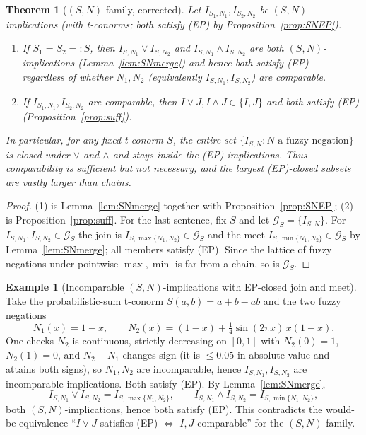 \documentclass{amsart}
\theoremstyle{plain}
\newtheorem{theorem}{Theorem}
\theoremstyle{definition}
\newtheorem{example}{Example}
\begin{document}
\begin{theorem}[$(S,N)$-family, corrected]\label{thm:SN}
Let $I_{S_1,N_1},I_{S_2,N_2}$ be $(S,N)$-implications (with t-conorms; both satisfy
\textup{(EP)} by Proposition~\ref{prop:SNEP}).
\begin{enumerate}
\item If $S_1=S_2=:S$, then $I_{S,N_1}\vee I_{S,N_2}$ and $I_{S,N_1}\wedge I_{S,N_2}$ are
\emph{both} $(S,N)$-implications (Lemma~\ref{lem:SNmerge}) and hence \emph{both} satisfy
\textup{(EP)} --- regardless of whether $N_1,N_2$ (equivalently $I_{S,N_1},I_{S,N_2}$) are
comparable.
\item If $I_{S_1,N_1},I_{S_2,N_2}$ are comparable, then $I\vee J,I\wedge J\in\{I,J\}$ and
both satisfy \textup{(EP)} (Proposition~\ref{prop:suff}).
\end{enumerate}
In particular, for any fixed t-conorm $S$, the entire set
$\{I_{S,N}:N\text{ a fuzzy negation}\}$ is closed under $\vee$ and $\wedge$ and stays
inside the \textup{(EP)}-implications.  Thus comparability is \emph{sufficient but not
necessary}, and the largest \textup{(EP)}-closed subsets are vastly larger than chains.
\end{theorem}

\begin{proof}
(1) is Lemma~\ref{lem:SNmerge} together with Proposition~\ref{prop:SNEP}; (2) is
Proposition~\ref{prop:suff}.  For the last sentence, fix $S$ and let
$\mathcal G_S=\{I_{S,N}\}$.  For $I_{S,N_1},I_{S,N_2}\in\mathcal G_S$ the join is
$I_{S,\max\{N_1,N_2\}}\in\mathcal G_S$ and the meet $I_{S,\min\{N_1,N_2\}}\in\mathcal G_S$
by Lemma~\ref{lem:SNmerge}; all members satisfy (EP).  Since the lattice of fuzzy
negations under pointwise $\max,\min$ is far from a chain, so is $\mathcal G_S$.
\end{proof}

\begin{example}[Incomparable $(S,N)$-implications with EP-closed join and meet]\label{ex:SN}
Take the probabilistic-sum t-conorm $S(a,b)=a+b-ab$ and the two fuzzy negations
\[
N_1(x)=1-x,\qquad N_2(x)=(1-x)+\tfrac14\sin(2\pi x)\,x(1-x).
\]
One checks $N_2$ is continuous, strictly decreasing on $[0,1]$ with $N_2(0)=1$,
$N_2(1)=0$, and $N_2-N_1$ changes sign (it is $\le 0.05$ in absolute value and attains both
signs), so $N_1,N_2$ are incomparable, hence $I_{S,N_1},I_{S,N_2}$ are incomparable
implications.  Both satisfy (EP).  By Lemma~\ref{lem:SNmerge},
\[
I_{S,N_1}\vee I_{S,N_2}=I_{S,\max\{N_1,N_2\}},\qquad
I_{S,N_1}\wedge I_{S,N_2}=I_{S,\min\{N_1,N_2\}},
\]
both $(S,N)$-implications, hence both satisfy (EP).  This contradicts the would-be
equivalence ``$I\vee J$ satisfies (EP) $\iff$ $I,J$ comparable'' for the $(S,N)$-family.
\end{example}
\end{document}

